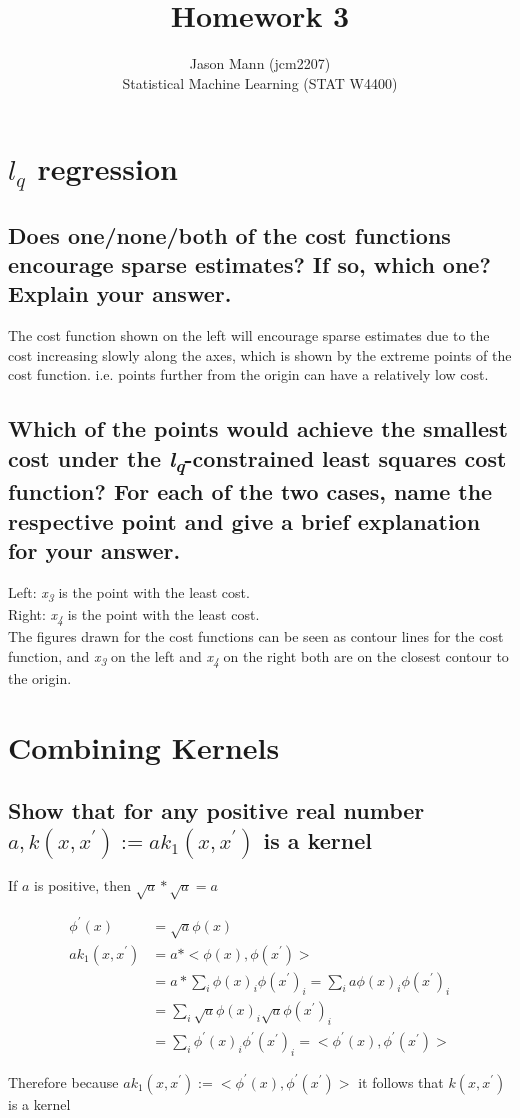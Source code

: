 \documentclass[11pt]{article}
\theoremstyle{quest}
\newcommand{\problem}[1]{\section{#1}}        %
\newcommand{\subproblem}[1]{\subsection{#1}}      %
\newcommand{\Sub}{\textsubscript}
\begin{document}
 
 
\title{Homework 3}
\author{\small{Jason Mann (jcm2207)}\\
\small{Statistical Machine Learning (STAT W4400)}}
\date{}
 
\maketitle


\problem{$l_q$ regression}

\subproblem{Does one/none/both of the cost functions encourage sparse estimates? If so, which one? Explain your answer.}
\begin{adjustwidth}{3.5em}{0em}
The cost function shown on the left will encourage sparse estimates due to the cost increasing slowly along the axes, which is shown by the extreme points of the cost function. i.e. points further from the origin can have a relatively low cost.
\end{adjustwidth}


\subproblem{Which of the points would achieve the smallest cost under the \textit{l\Sub{q}}-constrained least squares cost function? For each of the two cases, name the respective point and give a brief explanation for your answer.}
\begin{adjustwidth}{3.5em}{0em}
Left: \textit{x\Sub{3}} is the point with the least cost. \\
Right: \textit{x\Sub{4}} is the point with the least cost. \\
The figures drawn for the cost functions can be seen as contour lines for the cost function, and \textit{x\Sub{3}} on the left and \textit{x\Sub{4}} on the right both are on the closest contour to the origin.
\end{adjustwidth}




\problem{Combining Kernels}
\subproblem{Show that for any positive real number $a, k(x, x^{'}) := ak_1(x, x^{'})$ is a kernel}

\begin{adjustwidth}{3.5em}{0em}
If $a$ is positive, then $\sqrt{a}*\sqrt{a}=a$
\end{adjustwidth}
\begin{align*}
 \phi^{'}(x) &= \sqrt{a}\phi(x) \\
ak_1(x, x^{'}) &= a * <\phi(x), \phi(x^{'})> \\
&= a * \sum_i{\phi(x)_i\phi(x^{'})_i} = \sum_i{a\phi(x)_i\phi(x^{'})_i} \\
&= \sum_i{\sqrt{a}\phi(x)_i\sqrt{a}\phi(x^{'})_i} \\
&= \sum_i{ \phi^{'}(x)_i \phi^{'}(x^{'})_i} = <\phi^{'}(x), \phi^{'}(x^{'})> 
\end{align*}
\begin{adjustwidth}{3.5em}{0em}
Therefore because $ak_1(x, x^{'}) := <\phi^{'}(x), \phi^{'}(x^{'})>$ it follows that $k(x,x^{'})$ is a kernel
\end{adjustwidth}
\end{document}
